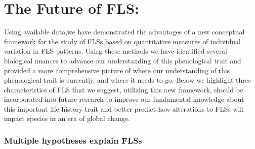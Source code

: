 \documentclass{article}
\begin{document}

\section*{The Future of FLS:}
Using available data,we have demonstrated the advantages of a new conceptual framework for the study of FLSs based on quantitative measures of individual variation in FLS patterns. Using these methods we have identified several biological nuances to advance our understanding of this phenological trait and provided a more comprehensive picture of where our understanding of this phenological trait is currently, and where it needs to go. Below we highlight three characteristics of FLS that we suggest, utilizing this new framework, should be incorporated into future research to improve our fundamental knowledge about this important life-history trait and better predict how alterations to FLSs will impact species in an era of global change.

\subsubsection*{Multiple hypotheses explain FLSs}
\end{document}
